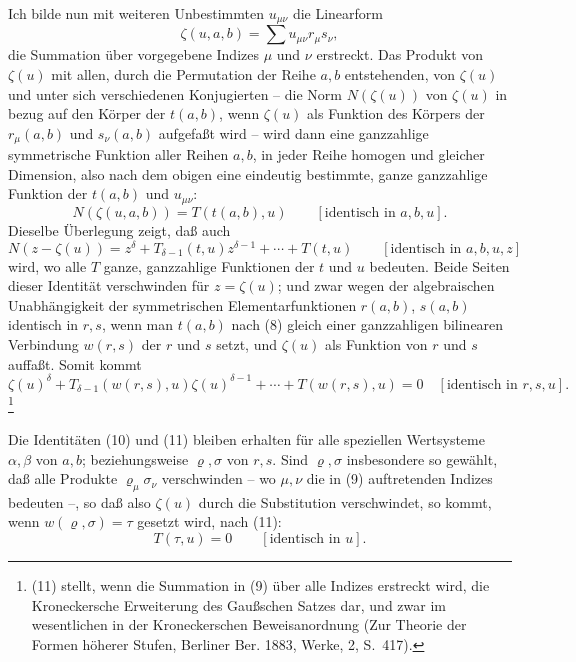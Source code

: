 Ich bilde nun mit weiteren Unbestimmten $u_{\mu\nu}$ die Linearform
\begin{equation}
 \zeta(u,a,b)=\sum u_{\mu\nu}r_\mu s_\nu,
\tag{9}
\end{equation}
die Summation über vorgegebene Indizes $\mu$ und $\nu$ erstreckt. Das Produkt von $\zeta(u)$ mit allen, durch die Permutation der Reihe $a,b$ entstehenden, von $\zeta(u)$ und unter sich verschiedenen Konjugierten -- die Norm $N(\zeta(u))$ von $\zeta(u)$ in bezug auf den Körper der $t(a,b)$, wenn $\zeta(u)$ als Funktion des Körpers der $r_\mu(a,b)$ und $s_\nu(a,b)$ aufgefaßt wird -- wird dann eine ganzzahlige symmetrische Funktion aller Reihen $a,b$, in jeder Reihe homogen und gleicher Dimension, also nach dem obigen eine eindeutig bestimmte, ganze ganzzahlige Funktion der $t(a,b)$ und $u_{\mu\nu}$:
\begin{equation}
 N(\zeta(u,a,b))=T(t(a,b),u)\qquad[\text{identisch in }a,b,u].
\tag{10}
\end{equation}
Dieselbe Überlegung zeigt, daß auch
\[
N(z-\zeta(u))=z^\delta+T_{\delta-1}(t,u)z^{\delta-1}+\cdots+T(t,u)
\qquad[\text{identisch in }a,b,u,z]
\]
wird, wo alle $T$ ganze, ganzzahlige Funktionen der $t$ und $u$ bedeuten. Beide Seiten dieser Identität verschwinden für $z=\zeta(u)$; und zwar wegen der algebraischen Unabhängigkeit der symmetrischen Elementarfunktionen $r(a,b)$, $s(a,b)$ identisch in $r,s$, wenn man $t(a,b)$ nach (8) gleich einer ganzzahligen bilinearen Verbindung $w(r,s)$ der $r$ und $s$ setzt, und $\zeta(u)$ als Funktion von $r$ und $s$ auffaßt. Somit kommt
\begin{equation}
\zeta(u)^\delta+T_{\delta-1}(w(r,s),u)\zeta(u)^{\delta-1}+\cdots+T(w(r,s),u)=0
\quad[\text{identisch in }r,s,u].
\tag{11}
\end{equation}\footnote{(11) stellt, wenn die Summation in (9) über alle Indizes erstreckt wird, die Kroneckersche Erweiterung des Gaußschen Satzes dar, und zwar im wesentlichen in der Kroneckerschen Beweisanordnung (Zur Theorie der Formen höherer Stufen, Berliner Ber. 1883, Werke, 2, S.~417).}

Die Identitäten (10) und (11) bleiben erhalten für alle speziellen Wertsysteme $\alpha,\beta$ von $a,b$; beziehungsweise $\varrho,\sigma$ von $r,s$. Sind $\varrho,\sigma$ insbesondere so gewählt, daß alle Produkte $\varrho_\mu\sigma_\nu$ verschwinden -- wo $\mu,\nu$ die in (9) auftretenden Indizes bedeuten --, so daß also $\zeta(u)$ durch die Substitution verschwindet, so kommt, wenn $w(\varrho,\sigma)=\tau$ gesetzt wird, nach (11):
\begin{equation}
 T(\tau,u)=0\qquad[\text{identisch in }u].
\tag{12}
\end{equation}

